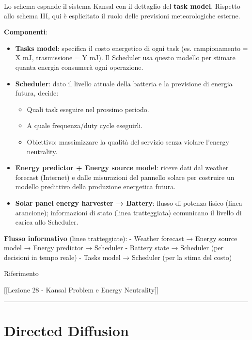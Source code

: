 \documentclass[
  italian,
  openany]{book}
\providecommand{\tightlist}{%
  \setlength{\itemsep}{0pt}\setlength{\parskip}{0pt}}
\begin{document}
Lo schema espande il sistema Kansal con il dettaglio del \textbf{task
model}. Rispetto allo schema III, qui è esplicitato il ruolo delle
previsioni meteorologiche esterne.

\textbf{Componenti}:

\begin{itemize}
\tightlist
\item
  \textbf{Tasks model}: specifica il costo energetico di ogni task (es.
  campionamento = X mJ, trasmissione = Y mJ). Il Scheduler usa questo
  modello per stimare quanta energia consumerà ogni operazione.
\item
  \textbf{Scheduler}: dato il livello attuale della batteria e la
  previsione di energia futura, decide:

  \begin{itemize}
  \tightlist
  \item
    Quali task eseguire nel prossimo periodo.
  \item
    A quale frequenza/duty cycle eseguirli.
  \item
    Obiettivo: massimizzare la qualità del servizio senza violare
    l'energy neutrality.
  \end{itemize}
\item
  \textbf{Energy predictor + Energy source model}: riceve dati dal
  weather forecast (Internet) e dalle misurazioni del pannello solare
  per costruire un modello predittivo della produzione energetica
  futura.
\item
  \textbf{Solar panel energy harvester → Battery}: flusso di potenza
  fisico (linea arancione); informazioni di stato (linea tratteggiata)
  comunicano il livello di carica allo Scheduler.
\end{itemize}

\textbf{Flusso informativo} (linee tratteggiate): - Weather forecast →
Energy source model → Energy predictor → Scheduler - Battery state →
Scheduler (per decisioni in tempo reale) - Tasks model → Scheduler (per
la stima del costo)

\begin{calloutnote}{Riferimento}

{[}{[}Lezione 28 - Kansal Problem e Energy Neutrality{]}{]}

\end{calloutnote}

\begin{center}\rule{0.5\linewidth}{0.5pt}\end{center}

\section{Directed Diffusion}\label{directed-diffusion}
\end{document}
